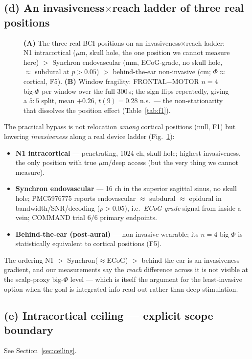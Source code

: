 \documentclass[11pt,a4paper]{article}
\begin{document}
\subsection{(d) An invasiveness$\times$reach ladder of three real positions}
\begin{figure}[t]
\centering
\resizebox{\textwidth}{!}{}
\caption{\textbf{(A)} The three real BCI positions on an invasiveness$\times$reach
ladder: N1 intracortical ($\mu$m, skull hole, the one position we cannot
measure here) $>$ Synchron endovascular (mm, ECoG-grade, no skull hole,
$\approx$ subdural at $p{>}0.05$) $>$ behind-the-ear non-invasive
(cm; $\Phi\approx$ cortical, F5). \textbf{(B)} Window fragility: FRONTAL$-$MOTOR
$n{=}4$ big-$\Phi$ per window over the full 300\,s; the sign flips repeatedly,
giving a $5{:}5$ split, mean $+0.26$, $t(9){=}0.28$ n.s.\ --- the
non-stationarity that dissolves the position effect (Table~\ref{tab:f1}).}
\label{fig:ladder}
\end{figure}

The practical bypass is not relocation \emph{among} cortical positions (null,
F1) but lowering \emph{invasiveness} along a real device ladder
(Fig.~\ref{fig:ladder}):
\begin{itemize}\itemsep0pt
  \item \textbf{N1 intracortical} --- penetrating, 1024 ch, skull hole; highest
  invasiveness, the only position with true $\mu$m/deep access (but the very
  thing we cannot measure).
  \item \textbf{Synchron endovascular} --- 16 ch in the superior sagittal
  sinus, no skull hole; PMC5976775 reports endovascular $\approx$ subdural
  $\approx$ epidural in bandwidth/SNR/decoding ($p{>}0.05$), i.e.\ \emph{ECoG-grade}
  signal from inside a vein; COMMAND trial $6/6$ primary endpoints.
  \item \textbf{Behind-the-ear (post-aural)} --- non-invasive wearable; its
  $n{=}4$ big-$\Phi$ is statistically equivalent to cortical positions (F5).
\end{itemize}
The ordering N1 $>$ Synchron($\approx$ECoG) $>$ behind-the-ear is an
invasiveness gradient, and our measurements say the \emph{reach} difference
across it is not visible at the scalp-proxy big-$\Phi$ level --- which is itself
the argument for the least-invasive option when the goal is integrated-info
read-out rather than deep stimulation.

\subsection{(e) Intracortical ceiling --- explicit scope boundary}
See Section~\ref{sec:ceiling}.
\end{document}
